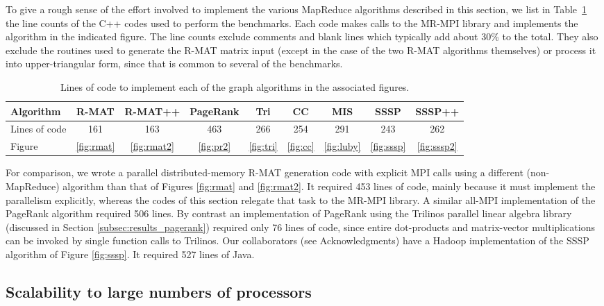To give a rough sense of the effort involved to implement the various
MapReduce algorithms described in this section, we list in Table~\ref{t:linecount} the line
counts of the C++ codes used to perform the benchmarks.
Each code makes calls to the MR-MPI library
and implements the algorithm in the indicated figure.  The line counts
exclude comments and blank lines which typically add about 30\% to the
total.  They also exclude the routines used to generate the R-MAT
matrix input (except in the case of the two R-MAT algorithms
themselves) or process it into upper-triangular form, since that is
common to several of the benchmarks.

\begin{table}
\begin{center}
\begin{tabular}{|l|c|c|c|c|c|c|c|c|}
\hline
Algorithm & R-MAT & R-MAT++ & PageRank & Tri & CC & MIS & SSSP & SSSP++ \\
\hline
Lines of code & 161 & 163 & 463 & 266 & 254 & 291 & 243 & 262 \\
Figure & \ref{fig:rmat} & \ref{fig:rmat2} & \ref{fig:pr2} & \ref{fig:tri} & \ref{fig:cc} & \ref{fig:luby} & \ref{fig:sssp} & \ref{fig:sssp2} \\
\hline
\end{tabular}
\caption{Lines of code to implement each of the graph
  algorithms in the associated figures.}
\label{t:linecount}
\end{center}
\end{table}

For comparison, we wrote a parallel distributed-memory R-MAT
generation code with explicit MPI calls using a different
(non-MapReduce) algorithm than that of Figures \ref{fig:rmat} and
\ref{fig:rmat2}.  It required 453 lines of code, mainly because it
must implement the parallelism explicitly, whereas the codes of this
section relegate that task to the MR-MPI library.  A similar all-MPI
implementation of the PageRank algorithm required 506 lines.  By
contrast an implementation of PageRank using the Trilinos parallel
linear algebra library (discussed in Section
\ref{subsec:results_pagerank}) required only 76 lines of code, since
entire dot-products and matrix-vector multiplications can be invoked by single function calls to
Trilinos.  Our collaborators (see Acknowledgments) have a Hadoop
implementation of the SSSP algorithm of Figure \ref{fig:sssp}.  It
required 527 lines of Java.

\subsection{Scalability to large numbers of processors}

